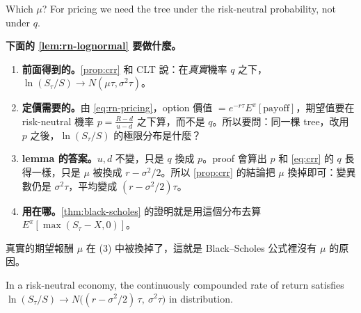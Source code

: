 Which $\mu$?
For pricing we need the tree under the risk-neutral probability, not under $q$.

\begin{remark}
	\textbf{下面的 \autoref{lem:rn-lognormal} 要做什麼。}
	\begin{enumerate}[(1),nosep]
		\item \textbf{前面得到的。}\autoref{prop:crr} 和 CLT 說：在\emph{真實}機率 $q$ 之下，$\ln(S_{\tau}/S)\to N(\mu\tau,\sigma^{2}\tau)$。
		\item \textbf{定價需要的。}由 \eqref{eq:rn-pricing}，option 價值 $=e^{-r\tau}E^{\pi}[\text{payoff}]$，期望值要在 risk-neutral 機率 $p=\frac{R-d}{u-d}$ 之下算，而不是 $q$。所以要問：同一棵 tree，改用 $p$ 之後，$\ln(S_{\tau}/S)$ 的極限分布是什麼？
		\item \textbf{lemma 的答案。}$u,d$ 不變，只是 $q$ 換成 $p$。proof 會算出 $p$ 和 \eqref{eq:crr} 的 $q$ 長得一樣，只是 $\mu$ 被換成 $r-\sigma^{2}/2$。所以 \autoref{prop:crr} 的結論把 $\mu$ 換掉即可：變異數仍是 $\sigma^{2}\tau$，平均變成 $(r-\sigma^{2}/2)\tau$。
		\item \textbf{用在哪。}\autoref{thm:black-scholes} 的證明就是用這個分布去算 $E^{\pi}[\max(S_{\tau}-X,0)]$。
	\end{enumerate}
	真實的期望報酬 $\mu$ 在 (3) 中被換掉了，這就是 Black--Scholes 公式裡沒有 $\mu$ 的原因。
\end{remark}
\suppend

\begin{lemma}
	\label{lem:rn-lognormal}
	In a risk-neutral economy, the continuously compounded rate of return satisfies $\ln(S_{\tau}/S)\to N\bigl((r-\sigma^{2}/2)\,\tau,\ \sigma^{2}\tau\bigr)$ in distribution.
\end{lemma}

